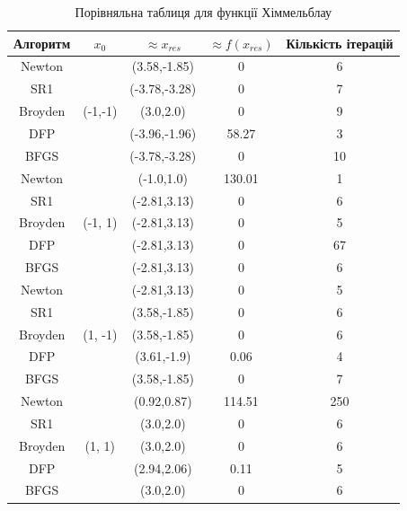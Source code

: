 \vspace{-0.8cm}
\begin{table}[h!]
    \centering
    \begin{tabular}{|c|c|c|c|c|}
        \hline
        \textbf{Алгоритм} & $x_{0}$ & $\approx x_{res}$ & $\approx f(x_{res})$ & \textbf{Кількість ітерацій}  \\
        \hline
        Newton & \multirow{5}{*}{(-1,-1)} & (3.58,-1.85) & 0 & 6 \\
        \cline{1-1} \cline{3-5}
        SR1 & & (-3.78,-3.28) & 0 & 7 \\
        \cline{1-1} \cline{3-5}
        Broyden & & (3.0,2.0) & 0 & 9 \\
        \cline{1-1} \cline{3-5}
        DFP & & (-3.96,-1.96) & 58.27 & 3 \\
        \cline{1-1} \cline{3-5}
        BFGS & & (-3.78,-3.28) & 0 & 10 \\
        \cline{1-1} \cline{3-5}
        \hline
        Newton & \multirow{5}{*}{(-1, 1)} & (-1.0,1.0) & 130.01 & 1 \\
        \cline{1-1} \cline{3-5}
        SR1 & & (-2.81,3.13) & 0 & 6 \\
        \cline{1-1} \cline{3-5}
        Broyden & & (-2.81,3.13) & 0 & 5 \\
        \cline{1-1} \cline{3-5}
        DFP & & (-2.81,3.13) & 0 & 67 \\
        \cline{1-1} \cline{3-5}
        BFGS & & (-2.81,3.13) & 0 & 6 \\
        \hline
        Newton & \multirow{5}{*}{(1, -1)} & (-2.81,3.13) & 0 & 5 \\
        \cline{1-1} \cline{3-5}
        SR1 & & (3.58,-1.85) & 0 & 6 \\
        \cline{1-1} \cline{3-5}
        Broyden & & (3.58,-1.85) & 0 & 6 \\
        \cline{1-1} \cline{3-5}
        DFP & & (3.61,-1.9) & 0.06 & 4 \\
        \cline{1-1} \cline{3-5}
        BFGS & & (3.58,-1.85) & 0 & 7 \\
        \hline
        Newton & \multirow{5}{*}{(1, 1)} & (0.92,0.87) & 114.51 & 250 \\
        \cline{1-1} \cline{3-5}
        SR1 & & (3.0,2.0) & 0 & 6 \\
        \cline{1-1} \cline{3-5}
        Broyden & & (3.0,2.0) & 0 & 6 \\
        \cline{1-1} \cline{3-5}
        DFP & & (2.94,2.06) & 0.11 & 5 \\
        \cline{1-1} \cline{3-5}
        BFGS & & (3.0,2.0) & 0 & 6 \\
        \hline
    \end{tabular}
    \caption{Порівняльна таблиця для функції Хіммельблау}
\end{table}

